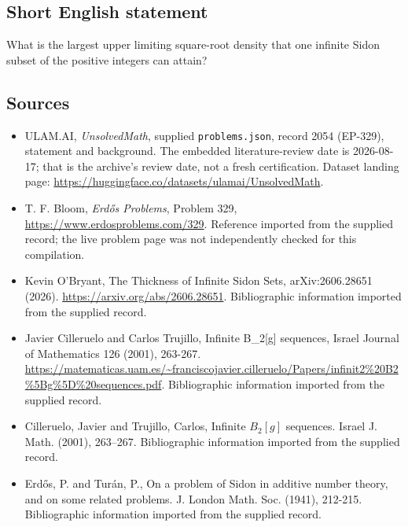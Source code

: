 \documentclass[11pt,a4paper]{article}
\begin{document}
\subsection{Short English statement}

What is the largest upper limiting square-root density that one infinite Sidon subset of the positive integers can attain?

\subsection{Sources}

{\small

\begin{itemize}

\item[\hypertarget{source:2054:1}{S1}] ULAM.AI, \emph{UnsolvedMath}, supplied \texttt{problems.json}, record 2054 (EP-329), statement and background. The embedded literature-review date is 2026-08-17; that is the archive’s review date, not a fresh certification. Dataset landing page: \url{https://huggingface.co/datasets/ulamai/UnsolvedMath}.

\item[\hypertarget{source:2054:2}{S2}] T. F. Bloom, \emph{Erdős Problems}, Problem 329, \url{https://www.erdosproblems.com/329}. Reference imported from the supplied record; the live problem page was not independently checked for this compilation.

\item[\hypertarget{source:2054:3}{S3}] Kevin O'Bryant, The Thickness of Infinite Sidon Sets, arXiv:2606.28651 (2026). \url{https://arxiv.org/abs/2606.28651}. Bibliographic information imported from the supplied record.

\item[\hypertarget{source:2054:4}{S4}] Javier Cilleruelo and Carlos Trujillo, Infinite B\_2[g] sequences, Israel Journal of Mathematics 126 (2001), 263-267. \url{https://matematicas.uam.es/~franciscojavier.cilleruelo/Papers/infinit2%20B2%5Bg%5D%20sequences.pdf}. Bibliographic information imported from the supplied record.

\item[\hypertarget{source:2054:5}{S5}] Cilleruelo, Javier and Trujillo, Carlos, Infinite {$B_2[g]$} sequences. Israel J. Math. (2001), 263--267. Bibliographic information imported from the supplied record.

\item[\hypertarget{source:2054:6}{S6}] Erd\H{o}s, P. and Tur\'{a}n, P., On a problem of Sidon in additive number theory, and on some related problems. J. London Math. Soc. (1941), 212-215. Bibliographic information imported from the supplied record.

\end{itemize}

}

\label{end:2054}
\end{document}
